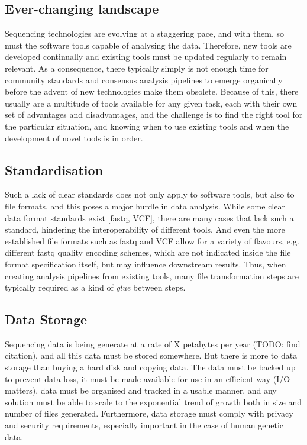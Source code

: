 \subsection{Ever-changing landscape}
Sequencing technologies are evolving at a staggering pace, and with them, so must the software tools capable of analysing the data. Therefore, new tools are developed continually and existing tools must be updated regularly to remain relevant. As a consequence, there typically simply is not enough time for community standards and consensus analysis pipelines to emerge organically before the advent of new technologies make them obsolete. Because of this, there usually are a multitude of tools available for any given task, each with their own set of advantages and disadvantages, and the challenge is to find the right tool for the particular situation, and knowing when to use existing tools and when the development of novel tools is in order.

\subsection{Standardisation}
Such a lack of clear standards does not only apply to software tools, but also to file formats, and this poses a major hurdle in data analysis. While some clear data format standards exist [fastq, VCF], there are many cases that lack such a standard, hindering the interoperability of different tools. And even the more established file formats such as fastq and VCF allow for a variety of flavours, e.g. different fastq quality encoding schemes, which are not indicated inside the file format specification itself, but may influence downstream results. Thus, when creating analysis pipelines from existing tools, many file transformation steps are typically required as a kind of \textit{glue} between steps.

\subsection{Data Storage}

Sequencing data is being generate at a rate of X petabytes per year (TODO: find citation), and all this data must be stored somewhere. But there is more to data storage than buying a hard disk and copying data. The data must be backed up to prevent data loss, it must be made available for use in an efficient way (I/O matters), data must be organised and tracked in a usable manner, and any solution must be able to scale to the exponential trend of growth both in size and number of files generated. Furthermore, data storage must comply with privacy and security requirements, especially important in the case of human genetic data.


